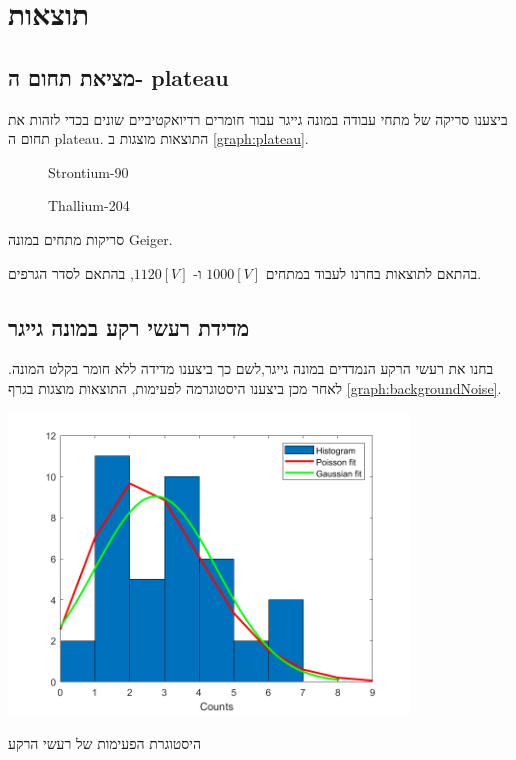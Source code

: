 \documentclass{article}
\begin{document}
\clearpage

\section{
תוצאות
}
\subsection{
מציאת תחום ה-
plateau
}
ביצענו סריקה של מתחי עבודה במונה גייגר עבור חומרים רדיואקטיביים שונים בכדי לזהות את תחום ה
\textenglish{plateau}.
התוצאות מוצגות ב
\ref{graph:plateau}.

\begin{graph}[H]
    \centering
    \begin{subfigure}[b]{0.49\textwidth}
    	\centering
    	\resizebox{\textwidth}{!}{}
    	\caption{\textenglish{Strontium-90}}
    
    \end{subfigure}
    \hfill
    \begin{subfigure}[b]{0.49\textwidth}
    	\centering
    	\resizebox{\textwidth}{!}{}
        \caption{\textenglish{Thallium-204}}
    \end{subfigure}
    \caption{
    סריקות מתחים במונה
    \textenglish{Geiger}.
    }
    \label{graph:plateau}
\end{graph}

בהתאם לתוצאות בחרנו לעבוד במתחים 
$1000[V]$
ו-
$1120[V]$,
בהתאם לסדר הגרפים.

\subsection{
מדידת רעשי רקע במונה גייגר
}
בחנו את רעשי הרקע הנמדדים במונה גייגר,לשם כך ביצענו מדידה ללא חומר בקלט המונה. לאחר מכן ביצענו היסטוגרמה לפעימות, התוצאות מוצגות בגרף
\ref{graph:backgroundNoise}.

\begin{graph}[ht!]
    \centering
    \includegraphics[width=0.8\textwidth]{hist.png}
    \caption{
    היסטוגרת הפעימות של רעשי הרקע
    }
    \label{graph:backgroundNoise}
\end{graph}
\end{document}
